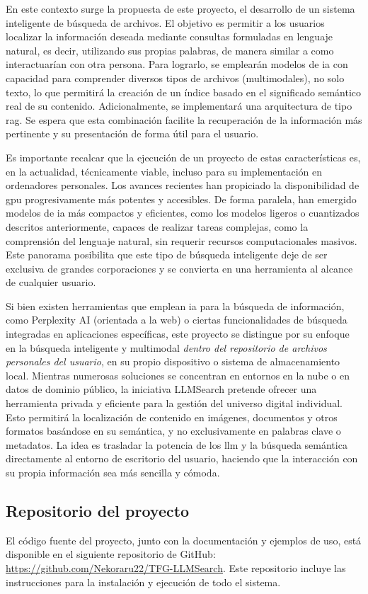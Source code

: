 En este contexto surge la propuesta de este proyecto, el desarrollo de un sistema inteligente de búsqueda de archivos. El objetivo es permitir a los usuarios localizar la información deseada mediante consultas formuladas en lenguaje natural, es decir, utilizando sus propias palabras, de manera similar a como interactuarían con otra persona. Para lograrlo, se emplearán modelos de \gls{ia} con capacidad para comprender diversos tipos de archivos (multimodales), no solo texto, lo que permitirá la creación de un índice basado en el significado semántico real de su contenido. Adicionalmente, se implementará una arquitectura de tipo \gls{rag}. Se espera que esta combinación facilite la recuperación de la información más pertinente y su presentación de forma útil para el usuario.

Es importante recalcar que la ejecución de un proyecto de estas características es, en la actualidad, técnicamente viable, incluso para su implementación en ordenadores personales. Los avances recientes han propiciado la disponibilidad de \gls{gpu} progresivamente más potentes y accesibles. De forma paralela, han emergido modelos de \gls{ia} más compactos y eficientes, como los modelos ligeros o cuantizados descritos anteriormente, capaces de realizar tareas complejas, como la comprensión del lenguaje natural, sin requerir recursos computacionales masivos. Este panorama posibilita que este tipo de búsqueda inteligente deje de ser exclusiva de grandes corporaciones y se convierta en una herramienta al alcance de cualquier usuario.

Si bien existen herramientas que emplean \gls{ia} para la búsqueda de información, como Perplexity AI (orientada a la web) o ciertas funcionalidades de búsqueda integradas en aplicaciones específicas, este proyecto se distingue por su enfoque en la búsqueda inteligente y multimodal \textit{dentro del repositorio de archivos personales del usuario}, en su propio dispositivo o sistema de almacenamiento local. Mientras numerosas soluciones se concentran en entornos en la nube o en datos de dominio público, la iniciativa LLMSearch pretende ofrecer una herramienta privada y eficiente para la gestión del universo digital individual. Esto permitirá la localización de contenido en imágenes, documentos y otros formatos basándose en su semántica, y no exclusivamente en palabras clave o metadatos. La idea es trasladar la potencia de los \gls{llm} y la búsqueda semántica directamente al entorno de escritorio del usuario, haciendo que la interacción con su propia información sea más sencilla y cómoda.

\subsection{Repositorio del proyecto}
El código fuente del proyecto, junto con la documentación y ejemplos de uso, está disponible en el siguiente repositorio de GitHub: \url{https://github.com/Nekoraru22/TFG-LLMSearch}. Este repositorio incluye las instrucciones para la instalación y ejecución de todo el sistema.